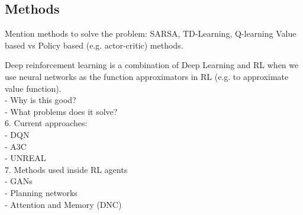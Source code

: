 \subsection{Methods}
Mention methods to solve the problem: SARSA, TD-Learning, Q-learning
Value based vs Policy based (e.g. actor-critic) methods.

Deep reinforcement learning is a combination of Deep Learning and RL when we use neural networks as the function approximators in RL (e.g. to approximate value function). \\
- Why is this good? \\
- What problems does it solve? \\

6. Current approaches: \\
- DQN \\
- A3C \\
- UNREAL \\

7. Methods used inside RL agents \\
- GANs \\
- Planning networks \\
- Attention and Memory (DNC) \\




